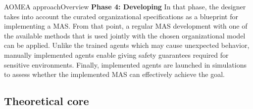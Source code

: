 \begin{frame}{AOMEA approach}{Overview}
    \textbf{Phase 4: Developing} \quad In that phase, the designer takes into account the curated organizational specifications as a blueprint for implementing a MAS. From that point, a regular MAS development with one of the available methods that is used jointly with the chosen organizational model can be applied. Unlike the trained agents which may cause unexpected behavior, manually implemented agents enable giving safety guarantees required for sensitive environments. Finally, implemented agents are launched in simulations to assess whether the implemented MAS can effectively achieve the goal.

\end{frame}


\subsection{Theoretical core}

